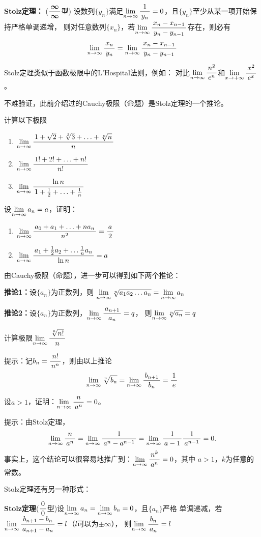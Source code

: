 \begin{shaded}
\begin{thx}
	{\bf Stolz定理：}
	($\df{\bm{\infty}}{\bm{\infty}}$型) 设数列$\{y_n\}$满足$\limn\df
	1{y_n}=0$，且$\{y_n\}$至少从某一项开始保持严格单调递增，
	则对任意数列$\{x_n\}$，若$\limn\df{x_n-x_{n-1}}{y_n-y_{n-1}}$存在，则必有
	$$\limn\df{x_n}{y_n}=\limn\df{x_n-x_{n-1}}{y_n-y_{n-1}}$$
\end{thx}

Stolz定理类似于函数极限中的L'Hospital法则，例如：
对比$\limn\df{n^2}{e^n}$和$\limx{+\infty}\df{x^2}{e^x}$。

不难验证，此前介绍过的Cauchy极限（命题）是Stolz定理的一个推论。

\bs
\egz 计算以下极限
\begin{enumerate}[(1)]
  \setlength{\itemindent}{1cm}
  \item $\limn\df{1+\sqrt 2+\sqrt[3]{3}+\ldots+\sqrt[n]{n}}{n}$ 
  \item $\limn\df{1!+2!+\ldots+n!}{n!}$
  \item $\limn\df{\ln n}{1+\frac12+\ldots+\frac1n}$
\end{enumerate}

\bs
\egz  设$\limn a_n=a$，证明：
\begin{enumerate}[(1)]
  \setlength{\itemindent}{1cm}
  \item $\limn\df{a_0+a_1+\ldots+na_n}{n^2}=\df a2$
  \item $\limn\df{a_1+\frac12a_2+\ldots\frac1na_n}{\ln n}=a$
\end{enumerate}

\bs
由Cauchy极限（命题），进一步可以得到如下两个推论：

\begin{thx}
{\bf 推论1：}设$\{a_n\}$为正数列，则
$\limn\sqrt[n]{a_1a_2\ldots a_n}=\limn a_n$

{\bf 推论2：}设$\{a_n\}$为正数列，$\limn\df{a_{n+1}}{a_n}=q$，
则$\limn\sqrt[n]{a_n}=q$
\end{thx}

\bs
\egz 计算极限$\limn\df{\sqrt[n]{n!}}{n}$

提示：记$b_n=\df{n!}{n^n}$，则由以上推论
$$\limn\sqrt[n]{b_n}=\limn\df{b_{n+1}}{b_n}=\df1e$$

\bs
\egz 设$a>1$，证明：$\limn\df{n}{a^n}=0$。

提示：由Stolz定理，
$$
	\limn\df{n}{a^n}=\limn\df1{a^n-a^{n-1}}
	=\limn\df1{a-1}\df1{a^{n-1}}=0.
$$
事实上，这个结论可以很容易地推广到：$\limn\df{n^k}{a^n}=0$，其中
$a>1$，$k$为任意的常数。

\bs
Stolz定理还有另一种形式：
\begin{thx}
	{\bf Stolz定理}($\df00$型)设$\limn a_n=\limn b_n=0$，且$\{a_n\}$严格
	单调递减，若$\limn\df{b_{n+1}-b_n}{a_{n+1}-a_n}=l$（$l$可以为$\pm\infty$），
	则$\limn\df{b_n}{a_n}=l$
\end{thx}
\end{shaded}

